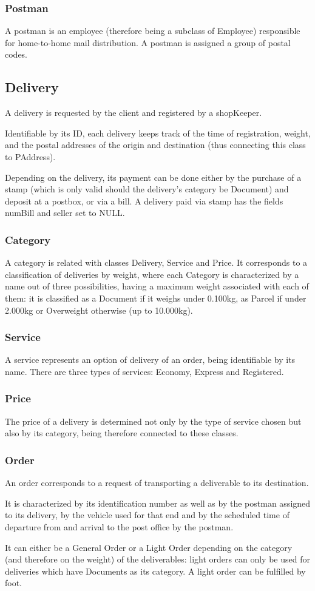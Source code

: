 \documentclass{report}[a4paper]
\theoremstyle{remark}
\begin{document}
\subsubsection{Postman}
A postman is an employee (therefore being a subclass of Employee) responsible for home-to-home mail distribution. A postman is assigned a group of postal codes.
\subsection{Delivery}
A delivery is requested by the client and registered by a shopKeeper. \par
Identifiable by its ID, each delivery keeps track of the time of registration, weight, and the postal addresses of the origin and destination (thus connecting this class to PAddress).\par
Depending on the delivery, its payment can be done either by the purchase of a stamp (which is only valid should the delivery’s category be Document) and deposit at a postbox, or via a bill. A delivery paid via stamp has the fields numBill and seller set to NULL.
\subsubsection{Category}
A category is related with classes Delivery, Service and Price. It corresponds to a classification of deliveries by weight, where each Category is characterized by a name out of three possibilities, having a maximum weight associated with each of them: it is classified as a Document if it weighs under 0.100kg, as Parcel if under 2.000kg or Overweight otherwise (up to 10.000kg).
\subsubsection{Service}
A service represents an option of delivery of an order, being identifiable by its name. There are three types of services: Economy, Express and Registered.
\subsubsection{Price}
The price of a delivery is determined not only by the type of service chosen but also by its category, being therefore connected to these classes.
\subsubsection{Order}
An order corresponds to a request of transporting a deliverable to its destination.\par
It is characterized by its identification number as well as by the postman assigned to its delivery, by the vehicle used for that end and by the scheduled time of departure from and arrival to the post office by the postman.\par
It can either be a General Order or a Light Order depending on the category (and therefore on the weight) of the deliverables: light orders can only be used for deliveries which have Documents as its category. A light order can be fulfilled by foot.
\end{document}
